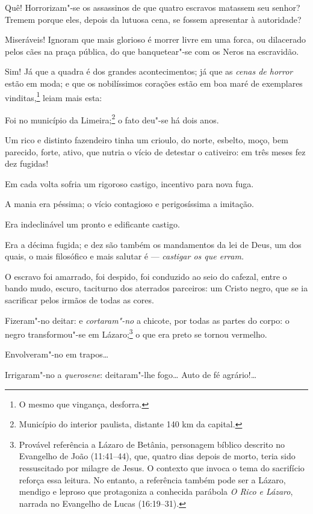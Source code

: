 Quê! Horrorizam"-se os assassinos de que quatro escravos matassem seu
senhor? Tremem porque eles, depois da lutuosa cena, se fossem apresentar
à autoridade?

Miseráveis! Ignoram que mais glorioso é morrer livre em uma forca, ou
dilacerado pelos cães na praça pública, do que banquetear"-se com os
Neros na escravidão.

Sim! Já que a quadra é dos grandes acontecimentos; já que as \emph{cenas
de horror} estão em moda; e que os nobilíssimos corações estão em boa
maré de exemplares vinditas,\footnote{O mesmo que vingança, desforra.}
leiam mais esta:

Foi no município da Limeira;\footnote{Município do interior paulista,
  distante 140 km da capital.} o fato deu"-se há dois anos.

Um rico e distinto fazendeiro tinha um crioulo, do norte, esbelto, moço,
bem parecido, forte, ativo, que nutria o vício de detestar o cativeiro:
em três meses fez dez fugidas!

Em cada volta sofria um rigoroso castigo, incentivo para nova fuga.

A mania era péssima; o vício contagioso e perigosíssima a imitação.

Era indeclinável um pronto e edificante castigo.

Era a décima fugida; e dez são também os mandamentos da lei de Deus, um
dos quais, o mais filosófico e mais salutar é --- \emph{castigar os que
erram.}

O escravo foi amarrado, foi despido, foi conduzido ao seio do cafezal,
entre o bando mudo, escuro, taciturno dos aterrados parceiros: um Cristo
negro, que se ia sacrificar pelos irmãos de todas as cores.

Fizeram"-no deitar: e \emph{cortaram"-no} a chicote, por todas as partes
do corpo: o negro transformou"-se em Lázaro;\footnote{Provável
  referência a Lázaro de Betânia, personagem bíblico descrito no
  Evangelho de João (11:41--44), que, quatro dias depois de morto, teria
  sido ressuscitado por milagre de Jesus. O contexto que invoca o tema
  do sacrifício reforça essa leitura. No entanto, a
  referência também pode ser a Lázaro, mendigo e leproso que protagoniza
  a conhecida parábola \emph{O Rico e Lázaro}, narrada no Evangelho de
  Lucas (16:19--31).} o que era preto se tornou vermelho.

Envolveram"-no em trapos\ldots{}

Irrigaram"-no a \emph{querosene}: deitaram"-lhe fogo\ldots{} Auto de fé
agrário!\ldots{}

